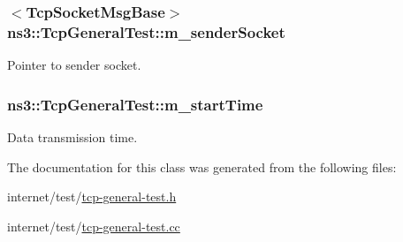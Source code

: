 \subsubsection[{\texorpdfstring{m\+\_\+sender\+Socket}{m_senderSocket}}]{$<${\bf Tcp\+Socket\+Msg\+Base}$>$ ns3\+::\+Tcp\+General\+Test\+::m\+\_\+sender\+Socket\hspace{0.3cm}{\ttfamily [private]}}\hypertarget{classns3_1_1TcpGeneralTest_a929f7587e339d8a3cb9fbeac7c083636}{}\label{classns3_1_1TcpGeneralTest_a929f7587e339d8a3cb9fbeac7c083636}


Pointer to sender socket. 

\subsubsection[{\texorpdfstring{m\+\_\+start\+Time}{m_startTime}}]{ ns3\+::\+Tcp\+General\+Test\+::m\+\_\+start\+Time\hspace{0.3cm}{\ttfamily [private]}}\hypertarget{classns3_1_1TcpGeneralTest_a9164d270007c08339775eb97ab644f0c}{}\label{classns3_1_1TcpGeneralTest_a9164d270007c08339775eb97ab644f0c}


Data transmission time. 



The documentation for this class was generated from the following files\+:\begin{DoxyCompactItemize}
\item 
internet/test/\hyperlink{tcp-general-test_8h}{tcp-\/general-\/test.\+h}\item 
internet/test/\hyperlink{tcp-general-test_8cc}{tcp-\/general-\/test.\+cc}\end{DoxyCompactItemize}
